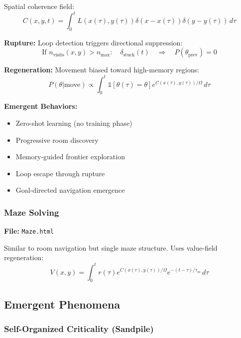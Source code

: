 \documentclass[11pt,a4paper]{article}
\theoremstyle{definition}
\theoremstyle{remark}
\begin{document}
Spatial coherence field:
\begin{equation}
C(x,y,t) = \int_0^t L(x(\tau),y(\tau)) \delta(x-x(\tau)) \delta(y-y(\tau))\,d\tau
\end{equation}

\textbf{Rupture:} Loop detection triggers directional suppression:
\begin{equation}
\text{If } n_{\text{visits}}(x,y) > n_{\text{max}}: \quad \delta_{\text{stuck}}(t) \quad \Rightarrow \quad P(\theta_{\text{prev}}) = 0
\end{equation}

\textbf{Regeneration:} Movement biased toward high-memory regions:
\begin{equation}
P(\theta|\text{move}) \propto \int_0^t \mathbb{1}[\theta(\tau) = \theta] e^{C(x(\tau),y(\tau))/\Omega}\,d\tau
\end{equation}

\textbf{Emergent Behaviors:}
\begin{itemize}
\item Zero-shot learning (no training phase)
\item Progressive room discovery
\item Memory-guided frontier exploration
\item Loop escape through rupture
\item Goal-directed navigation emergence
\end{itemize}

\subsubsection{Maze Solving}

\textbf{File:} \texttt{Maze.html}

Similar to room navigation but single maze structure. Uses value-field regeneration:
\begin{equation}
V(x,y) = \int_0^t r(\tau) e^{C(x(\tau),y(\tau))/\Omega} e^{-(t-\tau)/\tau_m}\,d\tau
\end{equation}

\subsection{Emergent Phenomena}

\subsubsection{Self-Organized Criticality (Sandpile)}
\end{document}
